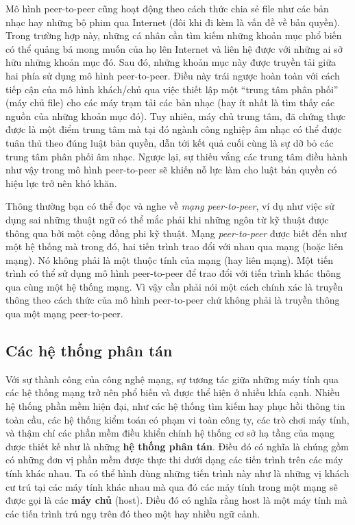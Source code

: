 Mô hình peer-to-peer cũng hoạt động theo cách thức chia sẻ file như các bản nhạc hay những
bộ phim qua Internet (đôi khi đi kèm là vấn đề về bản quyền). Trong trường hợp này, những
cá nhân cần tìm kiếm những khoản mục phổ biến có thể quảng bá mong muốn của họ lên
Internet và liên hệ được với những ai sở hữu những khoản mục đó. Sau đó, những khoản mục
này được truyền tải giữa hai phía sử dụng mô hình peer-to-peer. Điều này trái ngược hoàn
toàn với cách tiếp cận của mô hình khách/chủ qua việc thiết lập một ``trung tâm phân
phối'' (máy chủ file) cho các máy trạm tải các bản nhạc (hay ít nhất là tìm thấy các nguồn
của những khoản mục đó). Tuy nhiên, máy chủ trung tâm, đã chứng thực được là một điểm
trung tâm mà tại đó ngành công nghiệp âm nhạc có thể được tuân thủ theo đúng luật bản
quyền, dẫn tới kết quả cuối cùng là sự dỡ bỏ các trung tâm phân phối âm nhạc. Ngược lại,
sự thiếu vắng các trung tâm điều hành như vậy trong mô hình peer-to-peer sẽ khiến nỗ lực
làm cho luật bản quyền có hiệu lực trở nên khó khăn.

Thông thường bạn có thể đọc và nghe về \textit{mạng peer-to-peer}, ví dụ như việc sử dụng
sai những thuật ngữ có thể mắc phải khi những ngôn từ kỹ thuật được thông qua bởi một cộng
đồng phi kỹ thuật. Mạng \textit{peer-to-peer} được biết đến như một hệ thống mà trong đó,
hai tiến trình trao đổi với nhau qua mạng (hoặc liên mạng). Nó không phải là một thuộc
tính của mạng (hay liên mạng). Một tiến trình có thể sử dụng mô hình peer-to-peer để trao
đổi với tiến trình khác thông qua cùng một hệ thống mạng. Vì vậy cần phải nói một cách
chính xác là truyền thông theo cách thức của mô hình peer-to-peer chứ không phải là truyền
thông qua một mạng peer-to-peer.

\subsection*{Các hệ thống phân tán}
Với sự thành công của công nghệ mạng, sự tương tác giữa những máy tính qua các hệ thống
mạng trở nên phổ biến và được thể hiện ở nhiều khía cạnh. Nhiều hệ thống phần mềm hiện
đại, như các hệ thống tìm kiếm hay phục hồi thông tin toàn cầu, các hệ thống kiểm toán có
phạm vi toàn công ty, các trò chơi máy tính, và thậm chí các phần mềm điều khiển chính hệ
thống cơ sở hạ tầng của mạng được thiết kế như là những \textbf{hệ thống phân tán}. Điều
đó có nghĩa là chúng gồm có những đơn vị phần mềm được thực thi dưới dạng các tiến trình trên
các máy tính khác nhau. Ta có thể hình dùng những tiến trình này như là những vị khách cư
trú tại các máy tính khác nhau mà qua đó các máy tính trong một mạng sẽ được gọi là các
\textbf{máy chủ} (host). Điều đó có nghĩa rằng host là một máy tính mà các tiến trình
trú ngụ trên đó theo một hay nhiều ngữ cảnh.

